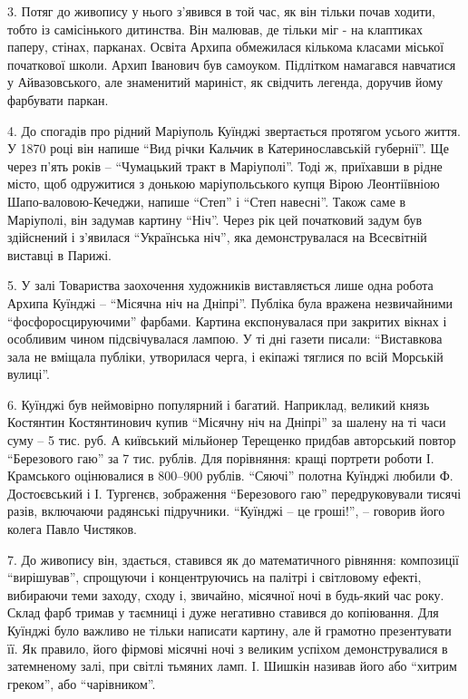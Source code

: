 
3. Потяг до живопису у нього з'явився в той час, як він тільки почав ходити,
тобто із самісінького дитинства. Він малював, де тільки міг - на клаптиках
паперу, стінах, парканах. Освіта Архипа обмежилася кількома класами міської
початкової школи. Архип Іванович був самоуком. Підлітком намагався навчатися у
Айвазовського, але знаменитий мариніст, як свідчить легенда, доручив йому
фарбувати паркан.

4. До спогадів про рідний Маріуполь Куїнджі звертається протягом усього життя.
У 1870 році він напише \enquote{Вид річки Кальчик в Катеринославській губернії}. Ще
через п'ять років – \enquote{Чумацький тракт в Маріуполі}. Тоді ж, приїхавши в рідне
місто, щоб одружитися з донькою маріупольського купця Вірою Леонтіївніою
Шапо\hyp{}валовою-Кечеджи, напише \enquote{Степ} і \enquote{Степ навесні}. Також саме в Маріуполі,
він задумав картину \enquote{Ніч}. Через рік цей початковий задум був здійснений і
з'явилася \enquote{Українська ніч}, яка демонструвалася на Всесвітній виставці в
Парижі.

5. У залі Товариства заохочення художників виставляється лише одна робота
Архипа Куїнджі – \enquote{Місячна ніч на Дніпрі}. Публіка була вражена незвичайними
\enquote{фосфоросцируючими} фарбами. Картина експонувалася при закритих вікнах і
особливим чином підсвічувалася лампою. У ті дні газети писали: \enquote{Виставкова зала
не вміщала публіки, утворилася черга, і екіпажі тяглися по всій Морській
вулиці}.


6. Куїнджі був неймовірно популярний і багатий. Наприклад, великий князь
Костянтин Костянтинович купив \enquote{Місячну ніч на Дніпрі} за шалену на ті часи суму
– 5 тис. руб. А київський мільйонер Терещенко придбав авторський повтор
\enquote{Березового гаю} за 7 тис. рублів. Для порівняння: кращі портрети роботи
І. Крамського оцінювалися в 800–900 рублів. \enquote{Сяючі} полотна Куїнджі любили
Ф. Достоєвський і І. Тургенєв, зображення \enquote{Березового гаю} передруковували тисячі
разів, включаючи радянські підручники. \enquote{Куїнджі – це гроші!}, – говорив його
колега Павло Чистяков.

7. До живопису він, здається, ставився як до математичного рівняння: композиції
\enquote{вирішував}, спрощуючи і концентруючись на палітрі і світловому ефекті,
вибираючи теми заходу, сходу і, звичайно, місячної ночі в будь-який час року.
Склад фарб тримав у таємниці і дуже негативно ставився до копіювання. Для
Куїнджі було важливо не тільки написати картину, але й грамотно презентувати
її. Як правило, його фірмові місячні ночі з великим успіхом демонструвалися в
затемненому залі, при світлі тьмяних ламп. І.  Шишкін називав його або \enquote{хитрим
греком}, або \enquote{чарівником}.


